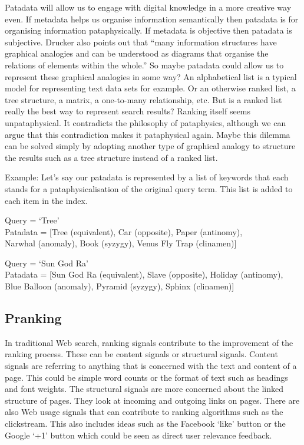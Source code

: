 Patadata will allow us to engage with digital knowledge in a more creative way even. If metadata helps us organise information semantically then patadata is for organising information pataphysically. If metadata is objective then patadata is subjective. Drucker also points out that ``many information structures have graphical analogies and can be understood as diagrams that organise the relations of elements within the whole.'' \autocite[p.16]{Drucker2009} So maybe patadata could allow us to represent these graphical analogies in some way? An alphabetical list is a typical model for representing text data sets for example. Or an otherwise ranked list, a tree structure, a matrix, a one-to-many relationship, etc. But is a ranked list really the best way to represent search results? Ranking itself seems unpataphysical. It contradicts the philosophy of pataphysics, although we can argue that this contradiction makes it pataphysical again. Maybe this dilemma can be solved simply by adopting another type of graphical analogy to structure the results such as a tree structure instead of a ranked list.

Example: Let's say our patadata is represented by a list of keywords that each stands for a pataphysicalisation of the original query term. This list is added to each item in the index.

Query      = `Tree'\\
Patadata = [Tree (equivalent),  Car (opposite), Paper (antinomy),\\ Narwhal (anomaly), Book (syzygy), Venus Fly Trap (clinamen)]

Query      = `Sun God Ra'\\
Patadata = [Sun God Ra (equivalent), Slave (opposite), Holiday (antinomy),\\ Blue Balloon (anomaly), Pyramid (syzygy), Sphinx (clinamen)]


\subsection*{Pranking}

In traditional Web search, ranking signals contribute to the improvement of the ranking process. These can be content signals or structural signals. Content signals are referring to anything that is concerned with the text and content of a page. This could be simple word counts or the format of text such as headings and font weights. The structural signals are more concerned about the linked structure of pages. They look at incoming and outgoing links on pages. There are also Web usage signals that can contribute to ranking algorithms such as the clickstream. This also includes ideas such as the Facebook `like' button or the Google `+1' button which could be seen as direct user relevance feedback.

